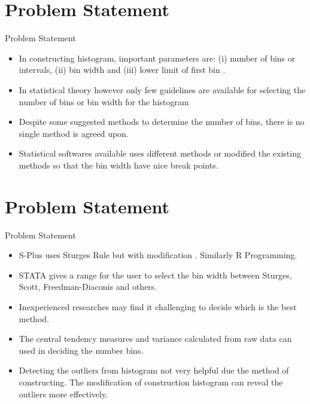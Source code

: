 \documentclass{beamer}
\begin{document}
\section{Problem Statement}
\begin{frame}{Problem Statement}
\begin{itemize}
	
	\item In constructing histogram, important parameters are: (i) number of bins or intervals, (ii) bin width and (iii) lower limit of first bin \cite{waterman1978estimation}.
	
	\item In statistical theory however only few guidelines are available for selecting the number of bins or bin width for the histogram \cite{he1997selecting,birge2006many}
	
	\item Despite some suggested methods to determine the number of bins, there is no single method is agreed upon. 
	
	\item Statistical softwares available uses different methods or modified the existing methods so that the bin width have nice break points. 
	
	
\end{itemize}

\end{frame}

\section{Problem Statement}

\begin{frame}{Problem Statement}
\begin{itemize}
	\item S-Plus uses Sturges Rule but with modification \cite{wand1997data}. Similarly R Programming.
	
	\item STATA gives a range for the user to select the bin width between Sturges, Scott, Freedman-Diaconis and others.
	
	\item Inexperienced researches may find it challenging to decide which is the best method.
	
	\item The central tendency measures and variance calculated from raw data can used in deciding the number bins.
		
	\item Detecting the outliers from histogram not very helpful due the method of constructing. The modification of construction histogram can reveal the outliers more effectively.
	
\end{itemize}
\end{frame}
\end{document}
